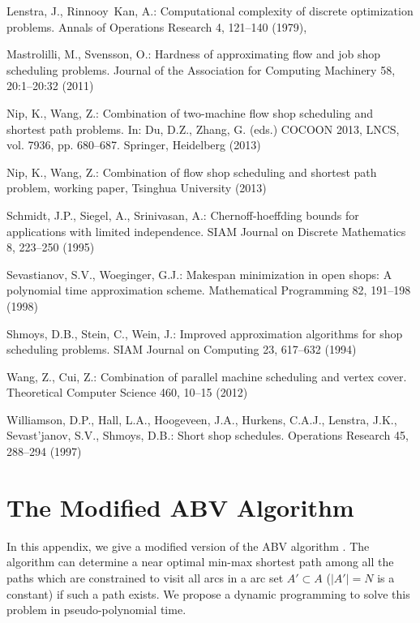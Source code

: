 \documentclass{llncs}
\makeatletter
\renewcommand{\appendix}{\par
\if@chapter@pp
\setcounter{chapter}{0}\setcounter{section}{0}\gdef\@chapapp{\appendixname}\gdef\thechapter{\@Alph\c@chapter}
\else
\setcounter{section}{0}\setcounter{subsection}{0}\gdef\thesection{Appendix \Alph{section}}
\fi
}
\numberwithin{subcase}{case}
\makeatother
\begin{document}
\begin{thebibliography}{10}
Lenstra, J., Rinnooy~Kan, A.: Computational complexity of discrete optimization
  problems. Annals of Operations Research  4,  121--140 (1979),

Mastrolilli, M., Svensson, O.: Hardness of approximating flow and job shop
  scheduling problems. Journal of the Association for Computing Machinery  58,  20:1--20:32 (2011)

Nip, K., Wang, Z.: Combination of two-machine flow shop scheduling and shortest
  path problems. In: Du, D.Z., Zhang, G. (eds.) COCOON 2013, LNCS, vol. 7936,
  pp. 680--687. Springer, Heidelberg (2013)

Nip, K., Wang, Z.: Combination of flow shop scheduling and shortest path problem,
  working paper, Tsinghua University (2013)

Schmidt, J.P., Siegel, A., Srinivasan, A.: Chernoff-hoeffding bounds for
  applications with limited independence. SIAM Journal on Discrete Mathematics
  8,  223--250 (1995)

Sevastianov, S.V., Woeginger, G.J.: Makespan minimization in open shops: A
  polynomial time approximation scheme. Mathematical Programming  82,  191--198
  (1998)

Shmoys, D.B., Stein, C., Wein, J.: Improved approximation algorithms for shop
  scheduling problems. SIAM Journal on Computing  23,  617--632 (1994)

Wang, Z., Cui, Z.: Combination of parallel machine scheduling and vertex cover.
  Theoretical Computer Science  460,  10--15 (2012)


Williamson, D.P., Hall, L.A., Hoogeveen, J.A., Hurkens, C.A.J., Lenstra, J.K.,
  Sevast'janov, S.V., Shmoys, D.B.: Short shop schedules. Operations Research
  45,  288--294 (1997)
\end{thebibliography}

\newpage
\appendix
\section{The Modified ABV Algorithm}\label{app_modABV}
In this appendix, we give a modified version of the ABV algorithm \cite{ABV06}. The algorithm can determine a near optimal min-max shortest path among all the paths which are constrained to visit all arcs in a arc set $A' \subset A$ ($|A'|=N$ is a constant) if such a path exists. We propose a dynamic programming to solve this problem in pseudo-polynomial time.
\end{document}
